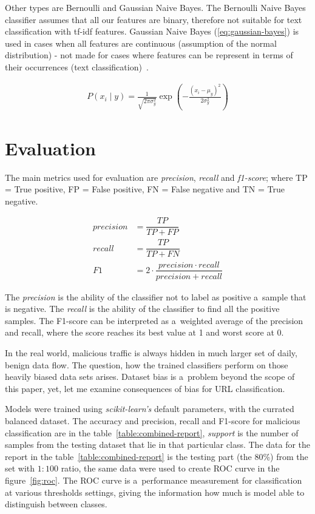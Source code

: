Other types are Bernoulli and Gaussian Naive Bayes.
The Bernoulli Naive Bayes classifier assumes that all our features are binary, therefore not suitable for text classification with tf-idf features.
Gaussian Naive Bayes (\ref{eq:gaussian-bayes}) is used in cases when all features are continuous (assumption of the normal distribution) - not made for cases where features can be represent in terms of their occurrences (text classification)~\cite{web:naive-bayes-differences}.

\begin{align}
    P(x_i \mid y) = \frac{1}{\sqrt{2\pi\sigma^2_y}} \exp\left(-\frac{(x_i - \mu_y)^2}{2\sigma^2_y}\right) \label{eq:gaussian-bayes}
\end{align}

\newpage
\section{Evaluation}\label{sec:evaluation}

The main metrics used for evaluation are \textit{precision}, \textit{recall} and \textit{f1-score};
where TP = True positive, FP = False positive, FN = False negative and TN = True negative.

\begin{align}
    precision &= \dfrac{TP}{TP + FP} \\
    recall &= \dfrac{TP}{TP + FN} \\
    F1 &= 2 \cdot \dfrac{precision \cdot recall}{precision + recall}
\end{align}

The \textit{precision} is the ability of the classifier not to label as positive a~sample that is negative.
The \textit{recall} is the ability of the classifier to find all the positive samples.
The F1-score can be interpreted as a~weighted average of the precision and recall, where the score reaches its best value at 1 and worst score at 0.

In the real world, malicious traffic is always hidden in much larger set of daily, benign data flow.
The question, how the trained classifiers perform on those heavily biased data sets arises.
Dataset bias is a~problem beyond the scope of this paper, yet, let me examine consequences of bias for URL classification.

Models were trained using \textit{scikit-learn's} default parameters, with the currated balanced dataset.
The accuracy and precision, recall and F1-score for malicious classification are in the table~\ref{table:combined-report}, \textit{support} is the number of samples from the testing dataset that lie in that particular class.
The data for the report in the table~\ref{table:combined-report} is the testing part (the 80\%) from the set with \( 1:100 \) ratio, the same data were used to create ROC curve in the figure~\ref{fig:roc}.
The ROC curve is a~performance measurement for classification at various thresholds settings, giving the information how much is model able to distinguish between classes.

